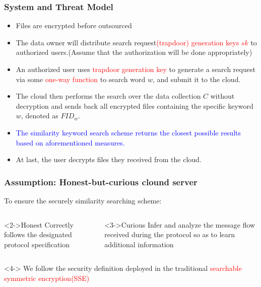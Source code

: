 \documentclass[handout]{beamer}
\begin{document}
\begin{frame}
	\frametitle{System and Threat Model}
	\begin{itemize}
		\item<1-> Files are encrypted before outsourced
		\item<2-> The data owner will distribute search request\textcolor{red}{(trapdoor) generation keys $sk$} to authorized users.(Assume that the authorization will be done appropriately)
		\item<3-> An authorized user uses \textcolor{red}{trapdoor generation key} to generate a search request via some \textcolor{red}{one-way function} to search word $w$, and submit it to the cloud.
		\item<4-> The cloud then performs the search over the data
		collection $C$ without decryption and sends back all encrypted files containing the specific keyword $w$, denoted as $FI{D_w}$.
		\item<5-> \textcolor{blue} {The
		similarity keyword search scheme returns the closest possible results based on aforementioned measures.}
		\item<6-> At last, the user decrypts files they received from the cloud.
	\end{itemize}
\end{frame}

\begin{frame}
	\frametitle{Assumption: Honest-but-curious clound server}
    To ensure the securely similarity searching scheme:
    \begin{columns}[t] 
    \begin{block}<2->{Honest}
    	Correctly follows the designated protocol specification
    \end{block}
        \begin{alertblock}<3->{Curious}
        	Infer and analyze the message flow received during the protocol so as to learn additional information
        \end{alertblock}
    \end{columns}
    \begin{columns}
    \begin{exampleblock}<4->{}
        We follow the security definition
        deployed in the traditional  \textcolor{red} {searchable symmetric encryption(SSE)}
    \end{exampleblock}
\end{columns}
\end{frame}
\end{document}
